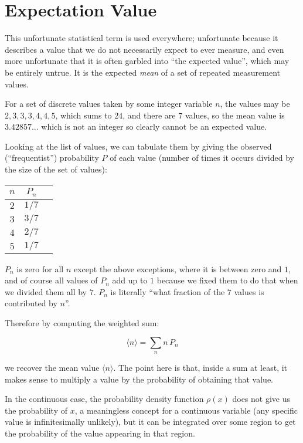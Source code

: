 \chapter{Expectation Value} \label{ch:expectation}

This unfortunate statistical term is used everywhere; unfortunate because it describes a value that we do not necessarily expect to ever measure, and even more unfortunate that it is often garbled into ``the expected value'', which may be entirely untrue. It is the expected \textit{mean} of a set of repeated measurement values.

For a set of discrete values taken by some integer variable $n$, the values may be $2, 3, 3, 3, 4, 4, 5$, which sums to $24$, and there are $7$ values, so the mean value is $3.42857...$ which is not an integer so clearly cannot be an expected value.

Looking at the list of values, we can tabulate them by giving the observed (``frequentist'') probability $P$ of each value (number of times it occurs divided by the size of the set of values):

\begin{center}
    \begin{tabular}{ c|c|c }
        $n$ & $P_n$ \\
        \hline
        $2$ & $1/7$  \\
        $3$ & $3/7$  \\
        $4$ & $2/7$  \\
        $5$ & $1/7$
    \end{tabular}
\end{center}

$P_n$ is zero for all $n$ except the above exceptions, where it is between zero and $1$, and of course all values of $P_n$ add up to $1$ because we fixed them to do that when we divided them all by $7$. $P_n$ is literally ``what fraction of the $7$ values is contributed by $n$''.

Therefore by computing the weighted sum:

$$ \langle {n} \rangle = \sum_n{n\,P_n} $$

we recover the mean value $\langle{n}\rangle$. The point here is that, inside a sum at least, it makes sense to multiply a value by the probability of obtaining that value.

In the continuous case, the probability density function $\rho(x)$ does not give us the probability of $x$, a meaningless concept for a continuous variable (any specific value is infinitesimally unlikely), but it can be integrated over some region to get the probability of the value appearing in that region.

